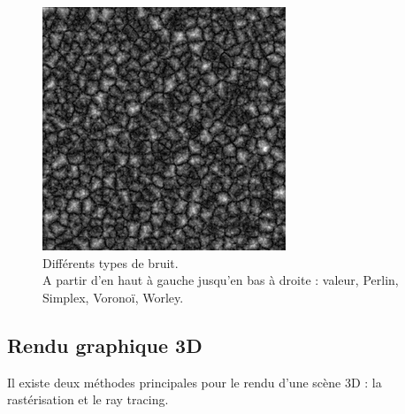 \documentclass[a4paper]{article}
\begin{document}
\begin{figure}[!h]
\begin{center}
     \end{center}
     \begin{center}
    \includegraphics[width=0.4\linewidth]{img/noise/worley.png}
    \end{center}
        \caption{\label{noises}Différents types de bruit\protect\footnotemark.\\
        A partir d'en haut à gauche jusqu'en bas à droite : valeur, Perlin, Simplex, Voronoï, Worley.}
    \end{figure}

            
\newpage

\subsection{Rendu graphique 3D} \label{raster/ray}

Il existe deux méthodes principales pour le rendu d'une scène 3D : la rastérisation et le ray tracing.
\end{document}
